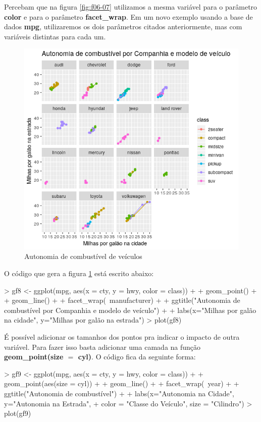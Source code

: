 \documentclass[12pt,a4paper,oneside]{erdc}
\begin{document}
\newpage

Percebam que na figura \ref{fig:f06-07} utilizamos a mesma variável para o parâmetro \textbf{color} e para o parâmetro \textbf{facet\_wrap}. Em um novo exemplo usando a base de dados \textbf{mpg}, utilizaremos os dois parâmetros citados anteriormente, mas com variáveis distintas para cada um.

\begin{figure}[htpb!]
	\centering
	\includegraphics[width=0.7\linewidth]{../figs/BP_Curso_TecComp_00_2019_f06-08}
	\caption{Autonomia de combustível de veículos}
	\label{fig:f06-08}
\end{figure}

O código que gera a figura \ref{fig:f06-08} está escrito abaixo:

\begin{Schunk}
\begin{Sinput}
> gf8 <- ggplot(mpg, aes(x = cty, y = hwy, color = class)) + 
+ geom_point() +
+ geom_line() +
+ facet_wrap(~manufacturer) +
+ ggtitle("Autonomia de combustível por Companhia e modelo de veículo") +
+ labs(x="Milhas por galão na cidade", y="Milhas por galão na estrada")
> plot(gf8)
\end{Sinput}
\end{Schunk}

É possível adicionar os tamanhos dos pontos pra indicar o impacto de outra variável. Para fazer isso basta adicionar uma camada na função \textbf{geom\_point(size $=$ cyl)}. O código fica da seguinte forma:

\begin{Schunk}
\begin{Sinput}
> gf9 <- ggplot(mpg, aes(x = cty, y = hwy, color = class)) +
+ geom_point(aes(size = cyl)) +
+ geom_line() +
+ facet_wrap(~year) +
+ ggtitle("Autonomia de combustível") +
+ labs(x="Autonomia na Cidade", y="Autonomia na Estrada",
+ color = "Classe do Veículo", size = "Cilindro")
> plot(gf9)
\end{Sinput}
\end{Schunk}
\end{document}
